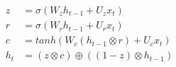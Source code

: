 \begin{align*}
z &= \sigma(W_{z}h_{t-1} + U_{z}x_{t})
\\
r &= \sigma(W_{r}h_{t-1} + U_{r}x_{t})
\\
c &= tanh(W_{c}(h_{t-1} \otimes r) + U_{c}x_{t})
\\
h_{t} &= (z \otimes c) \oplus ((1 - z) \otimes h_{t-1})
\end{align*}
